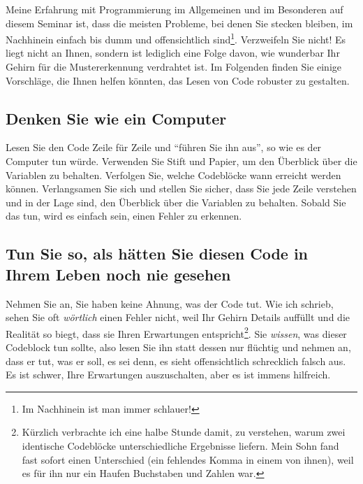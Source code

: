 \documentclass[
]{book}
\begin{document}
Meine Erfahrung mit Programmierung im Allgemeinen und im Besonderen auf diesem Seminar ist, dass die meisten Probleme, bei denen Sie stecken bleiben, im Nachhinein einfach bis dumm und offensichtlich sind\footnote{Im Nachhinein ist man immer schlauer!}. Verzweifeln Sie nicht! Es liegt nicht an Ihnen, sondern ist lediglich eine Folge davon, wie wunderbar Ihr Gehirn für die Mustererkennung verdrahtet ist. Im Folgenden finden Sie einige Vorschläge, die Ihnen helfen könnten, das Lesen von Code robuster zu gestalten.

\hypertarget{denken-sie-wie-ein-computer}{%
\subsection{Denken Sie wie ein Computer}\label{denken-sie-wie-ein-computer}}

Lesen Sie den Code Zeile für Zeile und ``führen Sie ihn aus'', so wie es der Computer tun würde. Verwenden Sie Stift und Papier, um den Überblick über die Variablen zu behalten. Verfolgen Sie, welche Codeblöcke wann erreicht werden können. Verlangsamen Sie sich und stellen Sie sicher, dass Sie jede Zeile verstehen und in der Lage sind, den Überblick über die Variablen zu behalten. Sobald Sie das tun, wird es einfach sein, einen Fehler zu erkennen.

\hypertarget{tun-sie-so-als-huxe4tten-sie-diesen-code-in-ihrem-leben-noch-nie-gesehen}{%
\subsection{Tun Sie so, als hätten Sie diesen Code in Ihrem Leben noch nie gesehen}\label{tun-sie-so-als-huxe4tten-sie-diesen-code-in-ihrem-leben-noch-nie-gesehen}}

Nehmen Sie an, Sie haben keine Ahnung, was der Code tut. Wie ich schrieb, sehen Sie oft \emph{wörtlich} einen Fehler nicht, weil Ihr Gehirn Details auffüllt und die Realität so biegt, dass sie Ihren Erwartungen entspricht\footnote{Kürzlich verbrachte ich eine halbe Stunde damit, zu verstehen, warum zwei identische Codeblöcke unterschiedliche Ergebnisse liefern. Mein Sohn fand fast sofort einen Unterschied (ein fehlendes Komma in einem von ihnen), weil es für ihn nur ein Haufen Buchstaben und Zahlen war.}. Sie \emph{wissen}, was dieser Codeblock tun sollte, also lesen Sie ihn statt dessen nur flüchtig und nehmen an, dass er tut, was er soll, es sei denn, es sieht offensichtlich schrecklich falsch aus. Es ist schwer, Ihre Erwartungen auszuschalten, aber es ist immens hilfreich.
\end{document}
